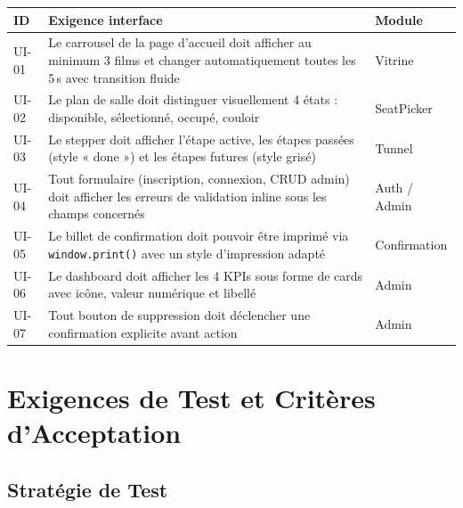 \documentclass[12pt,a4paper,openany]{report}
\begin{document}
\begin{longtable}{p{1.2cm}p{9cm}l}
  \toprule
  \textbf{ID} & \textbf{Exigence interface} & \textbf{Module} \\
  \midrule
  \endhead
  \bottomrule
  \endfoot

  UI-01 & Le carrousel de la page d'accueil doit afficher au minimum 3 films et changer automatiquement toutes les 5\,s avec transition fluide & Vitrine \\[4pt]

  UI-02 & Le plan de salle doit distinguer visuellement 4 états : disponible, sélectionné, occupé, couloir & SeatPicker \\[4pt]

  UI-03 & Le stepper doit afficher l'étape active, les étapes passées (style « done ») et les étapes futures (style grisé) & Tunnel \\[4pt]

  UI-04 & Tout formulaire (inscription, connexion, CRUD admin) doit afficher les erreurs de validation inline sous les champs concernés & Auth / Admin \\[4pt]

  UI-05 & Le billet de confirmation doit pouvoir être imprimé via \texttt{window.print()} avec un style d'impression adapté & Confirmation \\[4pt]

  UI-06 & Le dashboard doit afficher les 4 KPIs sous forme de cards avec icône, valeur numérique et libellé & Admin \\[4pt]

  UI-07 & Tout bouton de suppression doit déclencher une confirmation explicite avant action & Admin \\
\end{longtable}

\chapter{Exigences de Test et Critères d'Acceptation}

\section{Stratégie de Test}
\end{document}

